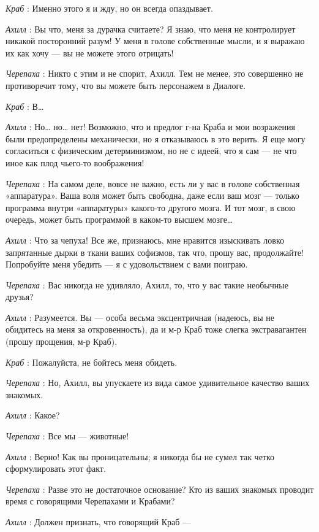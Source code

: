 \documentclass[../main.tex]{subfiles}
\begin{document}
\begin{dialogue}
\emph{Краб} : Именно этого я и жду, но он всегда опаздывает.

\emph{Ахилл} : Вы что, меня за дурачка считаете? Я знаю, что меня не контролирует никакой посторонний разум! У меня в голове собственные мысли, и я выражаю их как хочу --- вы не можете этого отрицать!

\emph{Черепаха} : Никто с этим и не спорит, Ахилл. Тем не менее, это совершенно не противоречит тому, что вы можете быть персонажем в Диалоге.

\emph{Краб} : В\ldots{}

\emph{Ахилл} : Но\ldots{} но\ldots{} нет! Возможно, что и предлог г-на Краба и мои возражения были предопределены механически, но я отказываюсь в это верить. Я еще могу согласиться с физическим детерминизмом, но не с идеей, что я сам --- не что иное как плод чьего-то воображения!

\emph{Черепаха} : На самом деле, вовсе не важно, есть ли у вас в голове собственная «аппаратура». Ваша воля может быть свободна, даже если ваш мозг --- только программа внутри «аппаратуры» какого-то другого мозга. И тот мозг, в свою очередь, может быть программой в каком-то высшем мозге\ldots{}

\emph{Ахилл} : Что за чепуха! Все же, признаюсь, мне нравится изыскивать ловко запрятанные дырки в ткани ваших софизмов, так что, прошу вас, продолжайте! Попробуйте меня убедить --- я с удовольствием с вами поиграю.

\emph{Черепаха} : Вас никогда не удивляло, Ахилл, то, что у вас такие необычные друзья?

\emph{Ахилл} : Разумеется. Вы --- особа весьма эксцентричная (надеюсь, вы не обидитесь на меня за откровенность), да и м-р Краб тоже слегка экстравагантен (прошу прощения, м-р Краб).

\emph{Краб} : Пожалуйста, не бойтесь меня обидеть.

\emph{Черепаха} : Но, Ахилл, вы упускаете из вида самое удивительное качество ваших знакомых.

\emph{Ахилл} : Какое?

\emph{Черепаха} : Все мы --- животные!

\emph{Ахилл} : Верно! Как вы проницательны; я никогда бы не сумел так четко сформулировать этот факт.

\emph{Черепаха} : Разве это не достаточное основание? Кто из ваших знакомых проводит время с говорящими Черепахами и Крабами?

\emph{Ахилл} : Должен признать, что говорящий Краб ---


\end{dialogue}
\end{document}
